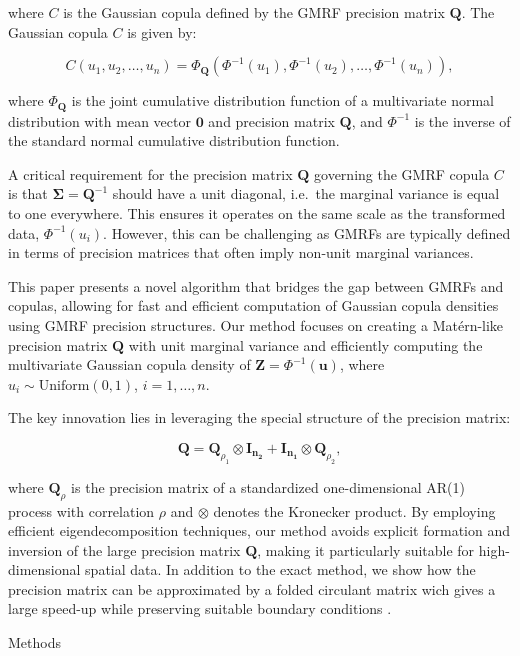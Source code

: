 \documentclass[
  12pt]{article}
\begin{document}
where \(C\) is the Gaussian copula defined by the GMRF precision matrix
\(\mathbf{Q}\). The Gaussian copula \(C\) is given by:

\[
C(u_1, u_2, \ldots, u_n) = \Phi_\mathbf{Q}(\Phi^{-1}(u_1), \Phi^{-1}(u_2), \ldots, \Phi^{-1}(u_n)),
\]

where \(\Phi_\mathbf{Q}\) is the joint cumulative distribution function
of a multivariate normal distribution with mean vector \(\mathbf{0}\)
and precision matrix \(\mathbf{Q}\), and \(\Phi^{-1}\) is the inverse of
the standard normal cumulative distribution function.

A critical requirement for the precision matrix \(\mathbf{Q}\) governing
the GMRF copula \(C\) is that \(\mathbf{\Sigma} = \mathbf{Q}^{-1}\)
should have a unit diagonal, i.e.~the marginal variance is equal to one
everywhere. This ensures it operates on the same scale as the
transformed data, \(\Phi^{-1}(u_i)\). However, this can be challenging
as GMRFs are typically defined in terms of precision matrices that often
imply non-unit marginal variances.

This paper presents a novel algorithm that bridges the gap between GMRFs
and copulas, allowing for fast and efficient computation of Gaussian
copula densities using GMRF precision structures. Our method focuses on
creating a Matérn-like precision matrix \(\mathbf{Q}\) with unit
marginal variance and efficiently computing the multivariate Gaussian
copula density of \(\mathbf{Z} = \Phi^{-1}(\mathbf{u})\), where
\(u_i \sim \text{Uniform}(0, 1)\), \(i = 1, \dots, n\).

The key innovation lies in leveraging the special structure of the
precision matrix:

\[
\mathbf{Q} = \mathbf{Q}_{\rho_1} \otimes \mathbf{I_{n_2}} + \mathbf{I_{n_1}} \otimes \mathbf{Q}_{\rho_2},
\]

where \(\mathbf{Q}_\rho\) is the precision matrix of a standardized
one-dimensional AR(1) process with correlation \(\rho\) and \(\otimes\)
denotes the Kronecker product. By employing efficient eigendecomposition
techniques, our method avoids explicit formation and inversion of the
large precision matrix \(\mathbf{Q}\), making it particularly suitable
for high-dimensional spatial data. In addition to the exact method, we
show how the precision matrix can be approximated by a folded circulant
matrix wich gives a large speed-up while preserving suitable boundary
conditions \citep{kent2022, mondal2018, besag2005}.

Methods
\end{document}

